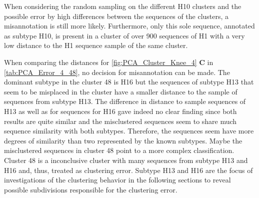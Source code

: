 When considering the random sampling on the different H10 clusters and the possible error by high differences between the sequences of the clusters, a misannotation is still more likely. Furthermore, only this sole sequence, annotated as subtype H10, is present in a cluster of over 900 sequences of H1 with a very low distance to the H1 sequence sample of the same cluster. 

\begin{table}[!hbt]
    \centering
    \caption[Anomalies in Segment 4 Cluster 48 (\texttt{PCA})]{\textbf{Anomalies in Segment 4 Cluster 48 (\texttt{PCA}).} The \glspl{MSA} mean distance of the given sequences in comparison to a sample of H16 sequences of the same cluster and a sample of H13 sequences present in another cluster. Only the first 20 columns are presented here, the full table can be found in the \href{https://github.com/ahenoch/Masterthesis.git}{Projects GitHub Repository}.}
    \label{tab:PCA_Error_4_48}
\end{table}

When comparing the distances for \autoref{fig:PCA_Cluster_Knee_4} \textbf{\textsf{C}} in \autoref{tab:PCA_Error_4_48}, no decision for misannotation can be made. The dominant subtype in the cluster 48 is H16 but the sequences of subtype H13 that seem to be misplaced in the cluster have a smaller distance to the sample of sequences from subtype H13. The difference in distance to sample sequences of H13 as well as for sequences for H16 gave indeed no clear finding since both results are quite similar and the misclustered sequences seem to share much sequence similarity with both subtypes. Therefore, the sequences seem have more degrees of similarity than two represented by the known subtypes. Maybe the misclustered sequences in cluster 48 point to a more complex classification. Cluster 48 is a inconclusive cluster with many sequences from subtype H13 and H16 and, thus, treated as clustering error. Subtype H13 and H16 are the focus of investigations of the clustering behavior in the following sections to reveal possible subdivisions responsible for the clustering error.

